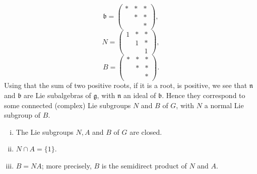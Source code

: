 \documentclass[reqno]{amsart} 
\begin{document}
\begin{equation*}
  \mathfrak{b} = 
\begin{pmatrix}
    \ast & \ast & \ast \\
    & \ast & \ast \\
    & & \ast
  \end{pmatrix}
,
\end{equation*}
\begin{equation*}
  N = 
\begin{pmatrix}
    1 & \ast & \ast \\
    & 1 & \ast \\
    & & 1
  \end{pmatrix}
,
\end{equation*}
\begin{equation*}
  B = 
\begin{pmatrix}
    \ast & \ast & \ast \\
    & \ast & \ast \\
    & & \ast
  \end{pmatrix}
.
\end{equation*}
Using that the sum of two positive roots, if it is a root, is positive, we see that $\mathfrak{n}$ and $\mathfrak{b}$ are Lie subalgebras of $\mathfrak{g}$, with $\mathfrak{n}$ an ideal of $\mathfrak{b}$.  Hence they correspond to some connected (complex) Lie subgroups $N$ and $B$ of $G$, with $N$ a normal Lie subgroup of $B$.
\begin{lemma}
  \begin{enumerate}
[(i)]
  \item The Lie subgroups $N, A$ and $B$ of $G$ are closed.
  \item $N \cap A = \{1\}$.
  \item $B = N A$; more precisely, $B$ is the semidirect product of $N$ and $A$.
  \end{enumerate}
\end{lemma}
\end{document}
